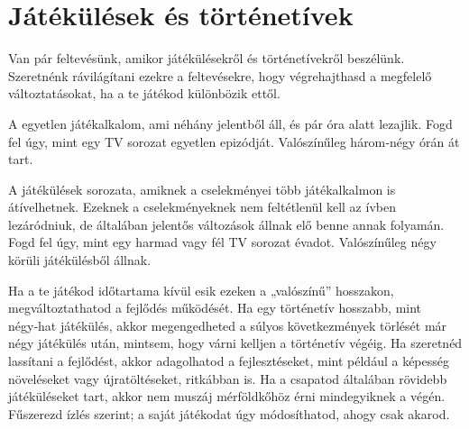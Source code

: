 \section{Játékülések és történetívek}

Van pár feltevésünk, amikor játékülésekről és történetívekről beszélünk. Szeretnénk rávilágítani ezekre a feltevésekre, hogy végrehajthasd a megfelelő változtatásokat, ha a te játékod különbözik ettől.

A  egyetlen játékalkalom, ami néhány jelentből áll, és pár óra alatt lezajlik. Fogd fel úgy, mint egy TV sorozat egyetlen epizódját. Valószínűleg három‑négy órán át tart.

A  játékülések sorozata, amiknek a cselekményei több játékalkalmon is átívelhetnek. Ezeknek a cselekményeknek nem feltétlenül kell az ívben lezáródniuk, de általában jelentős változások állnak elő benne annak folyamán. Fogd fel úgy, mint egy harmad vagy fél TV sorozat évadot. Valószínűleg négy körüli játékülésből állnak.

Ha a te játékod időtartama kívül esik ezeken a „valószínű” hosszakon, megváltoztathatod a fejlődés működését.  Ha egy történetív hosszabb, mint négy‑hat játékülés, akkor megengedheted a súlyos következmények törlését már négy játékülés után, mintsem, hogy várni kelljen a történetív végéig. Ha szeretnéd lassítani a fejlődést, akkor adagolhatod a fejlesztéseket, mint például a képesség növeléseket vagy újratöltéseket, ritkábban is. Ha a csapatod általában rövidebb játéküléseket tart, akkor nem muszáj mérföldkőhöz érni mindegyiknek a végén. Fűszerezd ízlés szerint; a saját játékodat úgy módosíthatod, ahogy csak akarod.
